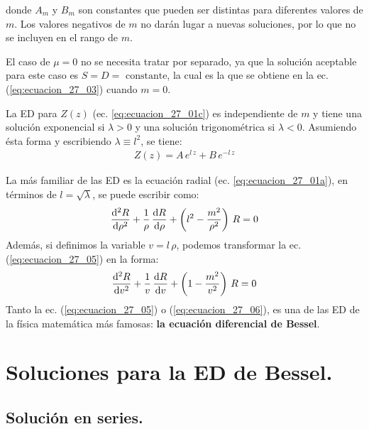 \documentclass[12pt]{article}
\numberwithin{equation}{section}
\begin{document}
donde $A_{m}$ y $B_{m}$ son constantes que pueden ser distintas para diferentes valores de $m$. Los valores negativos de $m$ no darán lugar a nuevas soluciones, por lo que no se incluyen en el rango de $m$.
\par
El caso de $\mu = 0$ no se necesita tratar por separado,  ya que la solución aceptable para este caso es $S = D = \mbox{ constante}$, la cual es la que se obtiene en la ec. (\ref{eq:ecuacion_27_03}) cuando $m = 0$.
\par
La ED para $Z (z)$ (ec. \ref{eq:ecuacion_27_01c}) es independiente de $m$  y tiene una solución exponencial si $\lambda > 0$ y una solución trigonométrica si $\lambda < 0$. Asumiendo ésta forma y escribiendo $\lambda \equiv l^{2}$, se tiene:
\begin{align}
Z (z) = A \, e^{l \, z} + B \, e^{- l \, z}
\label{eq:ecuacion_27_04}
\end{align}

La más familiar de las ED es la ecuación radial (ec. \ref{eq:ecuacion_27_01a}), en términos de $l = \sqrt{\lambda}$, se puede escribir como:
\begin{equation}
\dv[2]{R}{\rho} + \dfrac{1}{\rho} \, \dv{R}{\rho} + \left( l^{2} - \dfrac{m^{2}}{\rho^{2}} \right) \, R = 0
\label{eq:ecuacion_27_05}
\end{equation}
Además, si definimos la variable $v = l\, \rho$, podemos transformar la ec. (\ref{eq:ecuacion_27_05}) en la forma:
\begin{equation}
\dv[2]{R}{v} + \dfrac{1}{v} \, \dv{R}{v} + \left( 1 - \dfrac{m^{2}}{v^{2}} \right) \, R = 0
\label{eq:ecuacion_27_06}
\end{equation}
Tanto la ec. (\ref{eq:ecuacion_27_05}) o (\ref{eq:ecuacion_27_06}), es una de las ED de la física matemática más famosas: \textbf{la ecuación diferencial de Bessel}.

\section{Soluciones para la ED de Bessel.}
\subsection{Solución en series.}
\end{document}

